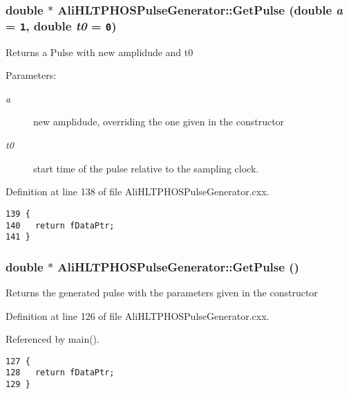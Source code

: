 \subsubsection{\setlength{\rightskip}{0pt plus 5cm}double $\ast$ Ali\-HLTPHOSPulse\-Generator::Get\-Pulse (double {\em a} = {\tt 1}, double {\em t0} = {\tt 0})}\label{classAliHLTPHOSPulseGenerator_a10}


Returns a Pulse with new amplidude and t0 \begin{Desc}
\item[Parameters:]
\begin{description}
\item[{\em a}]new amplidude, overriding the one given in the constructor \item[{\em t0}]start time of the pulse relative to the sampling clock. \end{description}
\end{Desc}


Definition at line 138 of file Ali\-HLTPHOSPulse\-Generator.cxx.

\footnotesize\begin{verbatim}139 {
140   return fDataPtr;
141 }
\end{verbatim}\normalsize 


\subsubsection{\setlength{\rightskip}{0pt plus 5cm}double $\ast$ Ali\-HLTPHOSPulse\-Generator::Get\-Pulse ()}\label{classAliHLTPHOSPulseGenerator_a9}


Returns the generated pulse with the parameters given in the constructor 

Definition at line 126 of file Ali\-HLTPHOSPulse\-Generator.cxx.

Referenced by main().

\footnotesize\begin{verbatim}127 {
128   return fDataPtr;
129 }
\end{verbatim}\normalsize 


